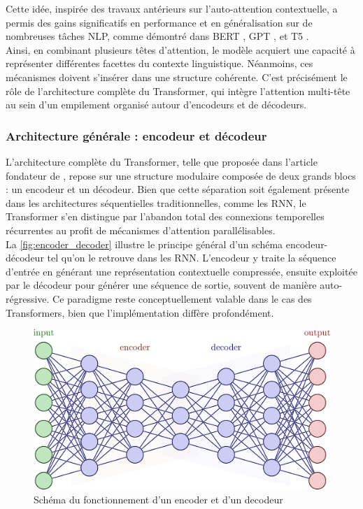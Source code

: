 Cette idée, inspirée des travaux antérieurs sur l’auto-attention contextuelle, a permis des gains significatifs en performance et en généralisation sur de nombreuses tâches NLP, comme démontré dans BERT \citep{devlin2018bert}, GPT \citep{radford2018gpt1, radford2019gpt2}, et T5 \citep{raffel2020t5}.\\

Ainsi, en combinant plusieurs têtes d’attention, le modèle acquiert une capacité à représenter différentes facettes du contexte linguistique. Néanmoins, ces mécanismes doivent s'insérer dans une structure cohérente. C’est précisément le rôle de l’architecture complète du Transformer, qui intègre l’attention multi-tête au sein d’un empilement organisé autour d’encodeurs et de décodeurs.

\subsubsection{Architecture générale : encodeur et décodeur}

L’architecture complète du Transformer, telle que proposée dans l’article fondateur de \citep{vaswani2017attention}, repose sur une structure modulaire composée de deux grands blocs : un encodeur et un décodeur. Bien que cette séparation soit également présente dans les architectures séquentielles traditionnelles, comme les RNN, le Transformer s’en distingue par l’abandon total des connexions temporelles récurrentes au profit de mécanismes d’attention parallélisables.\\

La \autoref{fig:encoder_decoder} illustre le principe général d’un schéma encodeur-décodeur tel qu’on le retrouve dans les RNN. L’encodeur y traite la séquence d’entrée en générant une représentation contextuelle compressée, ensuite exploitée par le décodeur pour générer une séquence de sortie, souvent de manière auto-régressive. Ce paradigme reste conceptuellement valable dans le cas des Transformers, bien que l’implémentation diffère profondément.

\begin{figure}[H]
    \centering
    \includegraphics[width=0.9\linewidth]{images/encoder_decoder.png}
    \caption{Schéma du fonctionnement d'un encoder et d'un decodeur}
    \label{fig:encoder_decoder}
\end{figure}

